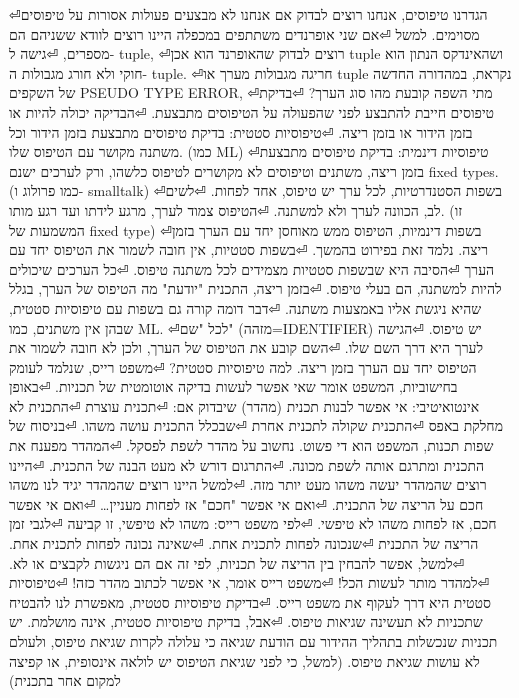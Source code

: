 \begin{טבלא}[!htbp]
⏎הגדרנו טיפוסים, אנחנו רוצים לבדוק אם אנחנו לא מבצעים פעולות אסורות על טיפוסים מסוימים. למשל
⏎אם שני אופרנדים משתתפים במכפלה היינו רוצים לוודא ששניהם הם מספרים,
⏎גישה ל- tuple,
⏎רוצים לבדוק שהאופרנד הוא אכן tuple ושהאינדקס הנתון הוא חוקי ולא חורג מגבולות ה- tuple.
⏎חריגה מגבולות מערך או tuple נקראת, במהדורה החדשה של השקפים PSEUDO TYPE ERROR,
⏎מתי השפה קובעת מהו סוג הערך?
⏎בדיקת טיפוסים חייבת להתבצע לפני שהפעולה על הטיפוסים מתבצעת.
⏎הבדיקה יכולה להיות או בזמן הידור או בזמן ריצה.
⏎טיפוסיות סטטית: בדיקת טיפוסים מתבצעת בזמן הידור וכל משתנה מקושר עם הטיפוס שלו. (כמו ML)
⏎טיפוסיות דינמית: בדיקת טיפוסים מתבצעת בזמן ריצה, משתנים וטיפוסים לא מקושרים לטיפוס כלשהו, ורק לערכים ישנם fixed types. (כמו פרולוג ו- smalltalk)
⏎בשפות הסטנדרטיות, לכל ערך יש טיפוס, אחד לפחות.
⏎לשים לב, הכוונה לערך ולא למשתנה.
⏎הטיפוס צמוד לערך, מרגע לידתו ועד רגע מותו. (זו המשמעות של fixed type)
⏎בשפות דינמיות, הטיפוס ממש מאוחסן יחד עם הערך בזמן ריצה. נלמד זאת בפירוט בהמשך.
⏎בשפות סטטיות, אין חובה לשמור את הטיפוס יחד עם הערך
⏎הסיבה היא שבשפות סטטיות מצמידים לכל משתנה טיפוס.
⏎כל הערכים שיכולים להיות למשתנה, הם בעלי טיפוס.
⏎בזמן ריצה, התכנית "יודעת" מה הטיפוס של הערך, בגלל שהיא ניגשת אליו באמצעות משתנה.
⏎דבר דומה קורה גם בשפות עם טיפוסיות סטטית, שבהן אין משתנים, כמו ML.
⏎לכל "שם" (מזהה=IDENTIFIER) יש טיפוס.
⏎הגישה לערך היא דרך השם שלו.
⏎השם קובע את הטיפוס של הערך, ולכן לא חובה לשמור את הטיפוס יחד עם הערך בזמן ריצה.
      למה טיפוסיות סטטית?
⏎משפט רייס, שנלמד לעומק בחישוביות, המשפט אומר שאי אפשר לעשות בדיקה אוטומטית של תכניות.
⏎באופן אינטואיטיבי: אי אפשר לבנות תכנית (מהדר) שיבדוק אם:
⏎תכנית עוצרת
⏎התכנית לא מחלקת באפס
⏎התכנית שקולה לתכנית אחרת
⏎שבכלל התכנית עושה משהו.
⏎בניסוח של שפות תכנות, המשפט הוא די פשוט. נחשוב על מהדר לשפת לפסקל.
⏎המהדר מפענח את התכנית ומתרגם אותה לשפת מכונה.
⏎התרגום דורש לא מעט הבנה של התכנית.
⏎היינו רוצים שהמהדר יעשה משהו מעט יותר מזה.
⏎למשל היינו רוצים שהמהדר יגיד לנו משהו חכם על הריצה של התכנית.
⏎ואם אי אפשר "חכם" אז לפחות מעניין…
⏎ואם אי אפשר חכם, אז לפחות משהו לא טיפשי.
⏎לפי משפט רייס: משהו לא טיפשי, זו קביעה
⏎לגבי זמן הריצה של התכנית
⏎שנכונה לפחות לתכנית אחת.
⏎שאינה נכונה לפחות לתכנית אחת.
⏎למשל, אפשר להבחין בין הריצה של תכניות, לפי זה אם הם ניגשות לקבצים או לא.
⏎למהדר מותר לעשות הכל!
⏎משפט רייס אומר, אי אפשר לכתוב מהדר כזה!
⏎טיפוסיות סטטית היא דרך לעקוף את משפט רייס.
⏎בדיקת טיפוסיות סטטית, מאפשרת לנו להבטיח שתכניות לא תעשינה שגיאות טיפוס.
⏎אבל, בדיקת טיפוסיות סטטית, אינה מושלמת. יש תכניות שנכשלות בתהליך ההידור עם הודעת שגיאה כי עלולה לקרות שגיאת טיפוס, ולעולם לא עושות שגיאת טיפוס. (למשל, כי לפני שגיאת הטיפוס יש לולאה אינסופית, או קפיצה למקום אחר בתכנית)


\end{טבלא}
